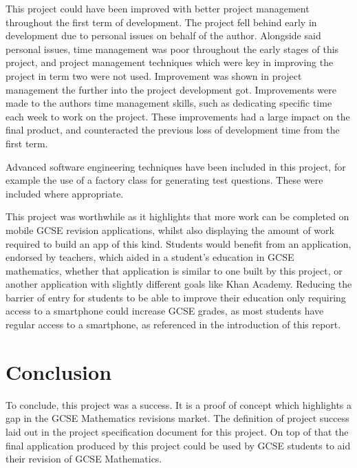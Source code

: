 \documentclass{article}
\begin{document}
This project could have been improved with better project management throughout the first term of development. The project fell behind early in development due to personal issues on behalf of the author. Alongside said personal issues, time management was poor throughout the early stages of this project, and project management techniques which were key in improving the project in term two were not used. Improvement was shown in project management the further into the project development got. Improvements were made to the authors time management skills, such as dedicating specific time each week to work on the project. These improvements had a large impact on the final product, and counteracted the previous loss of development time from the first term. \par

Advanced software engineering techniques have been included in this project, for example the use of a factory class for generating test questions. These were included where appropriate. \par

This project was worthwhile as it highlights that more work can be completed on mobile GCSE revision applications, whilst also displaying the amount of work required to build an app of this kind. Students would benefit from an application, endorsed by teachers, which aided in a student's education in GCSE mathematics, whether that application is similar to one built by this project, or another application with slightly different goals like Khan Academy. Reducing the barrier of entry for students to be able to improve their education only requiring access to a smartphone could increase GCSE grades, as most students have regular access to a smartphone, as referenced in the introduction of this report. \par

\section{Conclusion}
\label{section:conclusion}

To conclude, this project was a success. It is a proof of concept which highlights a gap in the GCSE Mathematics revisions market. The definition of project success laid out in the project specification document for this project. On top of that the final application produced by this project could be used by GCSE students to aid their revision of GCSE Mathematics. \par
\end{document}
